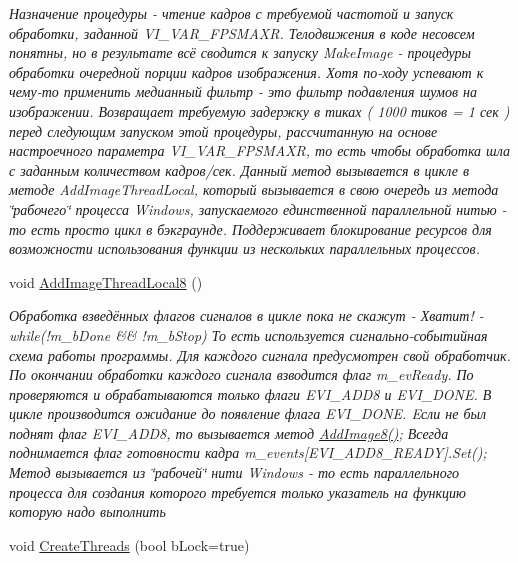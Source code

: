 \begin{DoxyCompactItemize}
\begin{DoxyCompactList}\small\item\em Назначение процедуры -\/ чтение кадров с требуемой частотой и запуск обработки, заданной V\+I\+\_\+\+V\+A\+R\+\_\+\+F\+P\+S\+M\+A\+X\+R. Телодвижения в коде несовсем понятны, но в результате всё сводится к запуску Make\+Image -\/ процедуры обработки очередной порции кадров изображения. Хотя по-\/ходу успевают к чему-\/то применить медианный фильтр -\/ это фильтр подавления шумов на изображении. Возвращает требуемую задержку в тиках ( 1000 тиков = 1 сек ) перед следующим запуском этой процедуры, рассчитанную на основе настроечного параметра V\+I\+\_\+\+V\+A\+R\+\_\+\+F\+P\+S\+M\+A\+X\+R, то есть чтобы обработка шла с заданным количеством кадров/сек. Данный метод вызывается в цикле в методе Add\+Image\+Thread\+Local, который вызывается в свою очередь из метода \char`\"{}рабочего\char`\"{} процесса Windows, запускаемого единственной параллельной нитью -\/ то есть просто цикл в бэкграунде. Поддерживает блокирование ресурсов для возможности использования функции из нескольких параллельных процессов. \end{DoxyCompactList}\item 
void \hyperlink{class_c_v_i_engine_base_a180f4a67ef6b4137c8b8565310aa7834}{Add\+Image\+Thread\+Local8} ()
\begin{DoxyCompactList}\small\item\em Обработка взведённых флагов сигналов в цикле пока не скажут -\/ Хватит! -\/ while(!m\+\_\+b\+Done \&\& !m\+\_\+b\+Stop) То есть используется сигнально-\/событийная схема работы программы. Для каждого сигнала предусмотрен свой обработчик. По окончании обработки каждого сигнала взводится флаг m\+\_\+ev\+Ready. По проверяются и обрабатываются только флаги E\+V\+I\+\_\+\+A\+D\+D8 и E\+V\+I\+\_\+\+D\+O\+N\+E. В цикле производится ожидание до появление флага E\+V\+I\+\_\+\+D\+O\+N\+E. Eсли не был поднят флаг E\+V\+I\+\_\+\+A\+D\+D8, то вызывается метод \hyperlink{class_c_v_i_engine_base_a3fe6ae4f9ac6b9422c22d99878f424f5}{Add\+Image8()}; Всегда поднимается флаг готовности кадра m\+\_\+events\mbox{[}E\+V\+I\+\_\+\+A\+D\+D8\+\_\+\+R\+E\+A\+D\+Y\mbox{]}.Set(); Метод вызывается из \char`\"{}рабочей\char`\"{} нити Windows -\/ то есть параллельного процесса для создания которого требуется только указатель на функцию которую надо выполнить \end{DoxyCompactList}\item 
void \hyperlink{class_c_v_i_engine_base_a053908c9c2c18583a13e6f6f79c8eeab}{Create\+Threads} (bool b\+Lock=true)

\end{DoxyCompactItemize}
